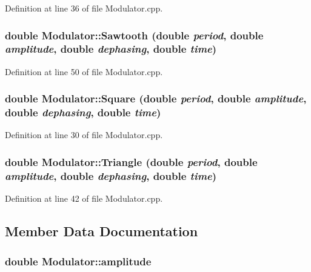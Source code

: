 Definition at line 36 of file Modulator.cpp.

\hypertarget{classModulator_a710b4f4fdd09c17dd017783e3b4ac9d7}{
\subsubsection[{Sawtooth}]{\setlength{\rightskip}{0pt plus 5cm}double Modulator::Sawtooth (double {\em period}, \/  double {\em amplitude}, \/  double {\em dephasing}, \/  double {\em time})}}
\label{classModulator_a710b4f4fdd09c17dd017783e3b4ac9d7}


Definition at line 50 of file Modulator.cpp.

\hypertarget{classModulator_ab9afc76dd8c1d81fd00124f3c67c84de}{
\subsubsection[{Square}]{\setlength{\rightskip}{0pt plus 5cm}double Modulator::Square (double {\em period}, \/  double {\em amplitude}, \/  double {\em dephasing}, \/  double {\em time})}}
\label{classModulator_ab9afc76dd8c1d81fd00124f3c67c84de}


Definition at line 30 of file Modulator.cpp.

\hypertarget{classModulator_a748c0bcd662d36b89544960401e24f72}{
\subsubsection[{Triangle}]{\setlength{\rightskip}{0pt plus 5cm}double Modulator::Triangle (double {\em period}, \/  double {\em amplitude}, \/  double {\em dephasing}, \/  double {\em time})}}
\label{classModulator_a748c0bcd662d36b89544960401e24f72}


Definition at line 42 of file Modulator.cpp.



\subsection{Member Data Documentation}
\hypertarget{classModulator_a4c384ef6fe79785c8750710ae2dc5be6}{
\subsubsection[{amplitude}]{\setlength{\rightskip}{0pt plus 5cm}double {\bf Modulator::amplitude}}}
\label{classModulator_a4c384ef6fe79785c8750710ae2dc5be6}


